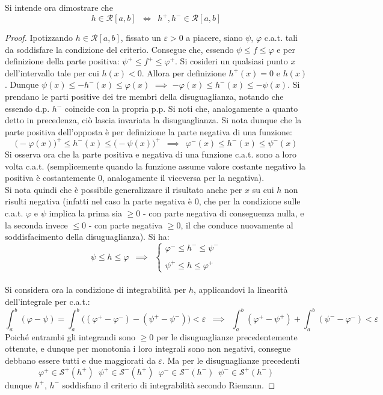 \documentclass[10pt]{article}
\theoremstyle{plain}
\begin{document}
Si intende ora dimostrare che
\[h \in \mathcal{R}[a,b] \enspace \Leftrightarrow \enspace h^+, h^- \in \mathcal{R}[a,b]\]
\begin{proof}
Ipotizzando $h \in \mathcal{R}[a,b]$, fissato un $\varepsilon > 0$ a piacere, siano $\psi$, $\varphi$ c.a.t. tali da soddisfare la condizione del criterio. Consegue che, essendo $\psi \leq f \leq \varphi$ e per definizione della parte positiva: $\psi^+ \leq f^+ \leq \varphi^+$. Si cosideri un qualsiasi punto $x$ dell'intervallo tale per cui $h(x) < 0$. Allora per definizione $h^+(x) = 0$ e $h(x)$. Dunque $\psi(x) \leq - h^-(x) \leq \varphi(x)$ $\implies$ $ - \varphi(x) \leq h^-(x) \leq - \psi(x)$. Si prendano le parti positive dei tre membri della disuguaglianza, notando che essendo d.p. $h^-$ coincide con la propria p.p. Si noti che, analogamente a quanto detto in precedenza, ciò lascia invariata la disuguaglianza. Si nota dunque che la parte positiva dell'opposta è per definizione la parte negativa di una funzione:
\[\big(-\varphi(x)\big)^+ \leq h^-(x) \leq \big(-\psi(x)\big)^+ \enspace \implies \enspace \varphi^-(x) \leq h^-(x) \leq \psi^-(x)\]
Si osserva ora che la parte positiva e negativa di una funzione c.a.t. sono a loro volta c.a.t. (semplicemente quando la funzione assume valore costante negativo la positiva è costantemente 0, analogamente il viceversa per la negativa). 
\\Si nota quindi che è possibile generalizzare il risultato anche per $x$ su cui $h$ non risulti negativa (infatti nel caso la parte negativa è $0$, che per la condizione sulle c.a.t. $\varphi$ e $\psi$ implica la prima sia $\geq 0$ - con parte negativa di conseguenza nulla, e la seconda invece $\leq 0$ - con parte negativa $\geq 0$, il che conduce nuovamente al soddisfacimento della disuguaglianza). Si ha:
\[\psi \leq h \leq \varphi \enspace \implies \enspace \begin{cases}
    \varphi^- \leq h^- \leq \psi^-\\
    \\
    \psi^+ \leq h \leq \varphi^+
\end{cases}\]
\\Si considera ora la condizione di integrabilità per $h$, applicandovi la linearità dell'integrale per c.a.t.:
\[\int_a^b (\varphi - \psi) = \int_a^b \big((\varphi^+ - \varphi^-) - (\psi^+ - \psi^-)\big) < \varepsilon \enspace \implies \enspace \int_a^b (\varphi^+ - \psi^+) + \int_a^b (\psi^- - \varphi^-) < \varepsilon\]
Poiché entrambi gli integrandi sono $\geq 0$ per le disuguaglianze precedentemente ottenute, e dunque per monotonia i loro integrali sono non negativi, consegue debbano essere tutti e due maggiorati da $\varepsilon$. Ma per le disuguaglianze precedenti
\[\varphi^+ \in  \mathcal{S}^+(h^+) \enspace \psi^+ \in  \mathcal{S}^-(h^+) \enspace \varphi^- \in  \mathcal{S}^-(h^-) \enspace \psi^- \in  \mathcal{S}^+(h^-)\]
dunque $h^+$, $h^-$ soddisfano il criterio di integrabilità secondo Riemann.
\end{proof}
\end{document}
